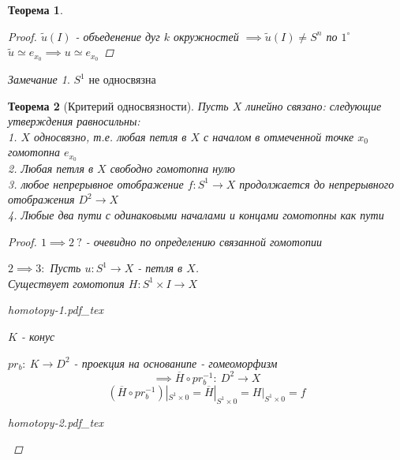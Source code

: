 \documentclass[a4paper]{article}
\newtheorem*{theorem}{Теорема}
\theoremstyle{definition}
\theoremstyle{remark}
\newtheorem*{remark}{Замечание}
\begin{document}
\begin{tcolorbox}[enhanced,breakable,skin first=enhanced,skin middle=enhanced,skin last=enhanced]
\begin{theorem}
\begin{proof}
            $ \widetilde{u}(I) $ - объеденение дуг $ k $ окружностей $ \implies
            \widetilde{u}(I) \neq S^n $ по $ 1^{\circ} $ $ \widetilde{u} \simeq
            e_{x_0} \implies u \simeq e_{x_0}$ 
        \end{proof}
    \end{theorem}
\end{tcolorbox}

\begin{tcolorbox}
\begin{remark}
    $ S^1 $ не односвязна
\end{remark}
\end{tcolorbox}

\begin{tcolorbox}
    \begin{theorem}[Критерий односвязности]
        Пусть $ X $ линейно связано: следующие утверждения равносильны:\\
        1. $ X $ односвязно, т.е. любая петля в $ X $ с началом в отмеченной точке
        $ x_0 $ гомотопна $ e_{x_0} $\\
        2. Любая петля в $ X $ свободно гомотопна нулю\\
        3. любое непрерывное отображение $ f: S^1 \to X $ продолжается до
        непрерывного отображения $ D^2 \to X $\\
        4. Любые два пути с одинаковыми началами и концами гомотопны как пути

        \begin{proof}
            $ 1 \implies 2 \ ? $  - очевидно по определению связанной гомотопии 

            $ 2 \implies 3: $ Пусть $ u: S^1 \to X $ - петля в $X$.\\
            Существует гомотопия $ H: S^1 \times I \to X$ 
            \begin{center}
                \def\svgwidth{0.5\columnwidth}
                {homotopy-1.pdf_tex}
            \end{center}

            $ K $ - конус

            $ pr_b: \ K \to D^2 $ - проекция на основанипе - гомеоморфизм
            \[
                \implies \overline{H} \circ pr_b^{-1}: \ D^2 \to X
            \]
            \[
                (\overline{H} \circ pr_b^{-1}) |_{S^1 \times 0} = \overline{H}
                |_{S^1 \times 0} = H |_{S^{1} \times 0} = f
            \]
            \begin{center}
                \def\svgwidth{0.5\columnwidth}
                {homotopy-2.pdf_tex}
            \end{center}


\end{proof}
\end{theorem}
\end{tcolorbox}
\end{document}
